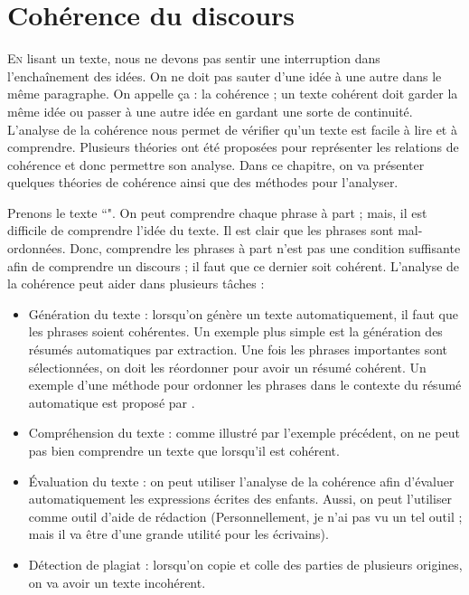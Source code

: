 \documentclass{KodeBook}
\begin{document}
		\mainmatter
	
\fi
\chapter{Cohérence du discours}

\begin{introduction}
	\lettrine{E}{n} lisant un texte, nous ne devons pas sentir une interruption dans l'enchaînement des idées.
	On ne doit pas sauter d'une idée à une autre dans le même paragraphe.
	On appelle ça : la cohérence ; un texte cohérent doit garder la même idée ou passer à une autre idée en gardant une sorte de continuité.
	L'analyse de la cohérence nous permet de vérifier qu'un texte est facile à lire et à comprendre. 
	Plusieurs théories ont été proposées pour représenter les relations de cohérence et donc permettre son analyse.
	Dans ce chapitre, on va présenter quelques théories de cohérence ainsi que des méthodes pour l'analyser.
\end{introduction} 

Prenons le texte ``".
On peut comprendre chaque phrase à part ; mais, il est difficile de comprendre l'idée du texte. 
Il est clair que les phrases sont mal-ordonnées. 
Donc, comprendre les phrases à part n'est pas une condition suffisante afin de comprendre un discours ; il faut que ce dernier soit cohérent.
L'analyse de la cohérence peut aider dans plusieurs tâches :
\begin{itemize}
	\item Génération du texte : lorsqu'on génère un texte automatiquement, il faut que les phrases soient cohérentes. 
	Un exemple plus simple est la génération des résumés automatiques par extraction. 
	Une fois les phrases importantes sont sélectionnées, on doit les réordonner pour avoir un résumé cohérent. 
	Un exemple d'une méthode pour ordonner les phrases dans le contexte du résumé automatique est proposé par \citet{2019-oufaida-al}.
	\item Compréhension du texte : comme illustré par l'exemple précédent, on ne peut pas bien comprendre un texte que lorsqu'il est cohérent.
	\item Évaluation du texte : on peut utiliser l'analyse de la cohérence afin d'évaluer automatiquement les expressions écrites des enfants. 
	Aussi, on peut l'utiliser comme outil d'aide de rédaction (Personnellement, je n'ai pas vu un tel outil ; mais il va être d'une grande utilité pour les écrivains).
	\item Détection de plagiat : lorsqu'on copie et colle des parties de plusieurs origines, on va avoir un texte incohérent. 
\end{itemize}
\end{document}
